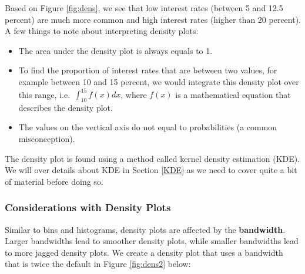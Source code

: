 \documentclass[
]{book}
\newenvironment{Shaded}{\begin{snugshade}}{\end{snugshade}}
\newcommand{\AttributeTok}[1]{\textcolor[rgb]{0.13,0.29,0.53}{#1}}
\newcommand{\DecValTok}[1]{\textcolor[rgb]{0.00,0.00,0.81}{#1}}
\newcommand{\FunctionTok}[1]{\textcolor[rgb]{0.13,0.29,0.53}{\textbf{#1}}}
\newcommand{\NormalTok}[1]{#1}
\newcommand{\SpecialCharTok}[1]{\textcolor[rgb]{0.81,0.36,0.00}{\textbf{#1}}}
\newcommand{\StringTok}[1]{\textcolor[rgb]{0.31,0.60,0.02}{#1}}
\providecommand{\tightlist}{%
  \setlength{\itemsep}{0pt}\setlength{\parskip}{0pt}}
\begin{document}
Based on Figure \ref{fig:dens}, we see that low interest rates (between 5 and 12.5 percent) are much more common and high interest rates (higher than 20 percent). A few things to note about interpreting density plots:

\begin{itemize}
\tightlist
\item
  The area under the density plot is always equals to 1.
\item
  To find the proportion of interest rates that are between two values, for example between 10 and 15 percent, we would integrate this density plot over this range, i.e.~\(\int_{10}^{15} f(x) dx\), where \(f(x)\) is a mathematical equation that describes the density plot.
\item
  The values on the vertical axis do not equal to probabilities (a common misconception).
\end{itemize}

The density plot is found using a method called kernel density estimation (KDE). We will over details about KDE in Section \ref{KDE} as we need to cover quite a bit of material before doing so.

\subsubsection{Considerations with Density Plots}\label{considerations-with-density-plots}

Similar to bins and histograms, density plots are affected by the \textbf{bandwidth}. Larger bandwidths lead to smoother density plots, while smaller bandwidths lead to more jagged density plots. We create a density plot that uses a bandwidth that is twice the default in Figure \ref{fig:dens2} below:

\begin{Shaded}
\end{Shaded}
\end{document}
